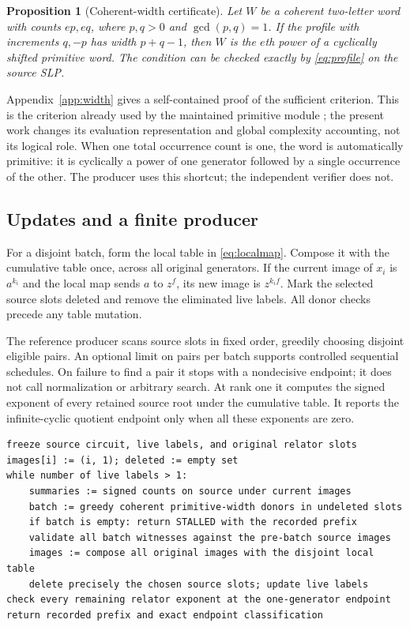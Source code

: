 \documentclass[11pt,letterpaper]{article}
\newtheorem{proposition}[theorem]{Proposition}
\theoremstyle{definition}
\theoremstyle{remark}\newtheorem{remark}[theorem]{Remark}
\begin{document}
\begin{proposition}[Coherent-width certificate]
\label{prop:width}
Let $W$ be a coherent two-letter word with counts $ep,eq$, where $p,q>0$
and $\gcd(p,q)=1$. If the profile with increments $q,-p$ has width
$p+q-1$, then $W$ is the $e$th power of a cyclically shifted primitive word.
The condition can be checked exactly by \eqref{eq:profile} on the source SLP.
\end{proposition}

Appendix~\ref{app:width} gives a self-contained proof of the sufficient
criterion. This is the criterion already used by the maintained primitive
module \cite{repo-primitive}; the present work changes its evaluation
representation and global complexity accounting, not its logical role.
When one total occurrence count is one, the word is automatically primitive:
it is cyclically a power of one generator followed by a single occurrence of
the other. The producer uses this shortcut; the independent verifier does not.

\subsection{Updates and a finite producer}

For a disjoint batch, form the local table in \eqref{eq:localmap}. Compose it
with the cumulative table once, across all original generators. If the current
image of $x_i$ is $a^{k_i}$ and the local map sends $a$ to $z^f$, its new image
is $z^{k_if}$. Mark the selected source slots deleted and remove the eliminated
live labels. All donor checks precede any table mutation.

The reference producer scans source slots in fixed order, greedily choosing
disjoint eligible pairs. An optional limit on pairs per batch supports
controlled sequential schedules. On failure to find a pair it stops with a
nondecisive endpoint; it does not call normalization or arbitrary search.
At rank one it computes the signed exponent of every retained source root
under the cumulative table. It reports the infinite-cyclic quotient endpoint
only when all these exponents are zero.

\begin{lstlisting}[caption={Raw source-anchored producer; local operations are exact.}]
freeze source circuit, live labels, and original relator slots
images[i] := (i, 1); deleted := empty set
while number of live labels > 1:
    summaries := signed counts on source under current images
    batch := greedy coherent primitive-width donors in undeleted slots
    if batch is empty: return STALLED with the recorded prefix
    validate all batch witnesses against the pre-batch source images
    images := compose all original images with the disjoint local table
    delete precisely the chosen source slots; update live labels
check every remaining relator exponent at the one-generator endpoint
return recorded prefix and exact endpoint classification
\end{lstlisting}
\end{document}
